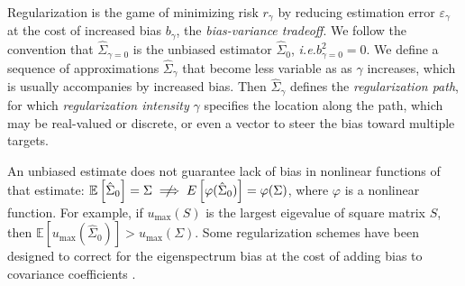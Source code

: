 Regularization is the game of minimizing risk $r_\gamma$ by reducing estimation error $\varepsilon_\gamma$ at the cost of increased bias $b_\gamma$, the \emph{bias-variance tradeoff}.  
We follow the convention that $\hat\Sigma_{\gamma=0}$ is the unbiased estimator $\hat\Sigma_0$, \emph{i.e.}\;$b_{\gamma=0}^2 = 0$. 
We define a sequence of approximations $\hat\Sigma_\gamma$ that become less variable as as $\gamma$ increases, which is usually accompanies by increased bias. Then $\hat\Sigma_\gamma$ defines the \emph{regularization path}, for which \emph{regularization intensity} $\gamma$ specifies the location along the path, which may be real-valued or discrete, or even a vector to steer the bias toward multiple targets.  

An unbiased estimate does not guarantee lack of bias in nonlinear functions of that estimate: $\mathbb E\left[\hat\Sigma_0\right]=\Sigma \centernot\implies  E\left[\varphi(\hat\Sigma_0)\right]=\varphi(\Sigma)$, where $\varphi$ is a nonlinear function. For example, if $u_{\max}(S)$ is the largest eigevalue of square matrix $S$, then $\mathbb E\left[u_{\max}(\hat\Sigma_0)\right] > u_{\max}(\Sigma)$. Some regularization schemes have been designed to correct for the eigenspectrum bias  at the cost of adding bias to covariance coefficients \citep{Ledoit:2004}.

